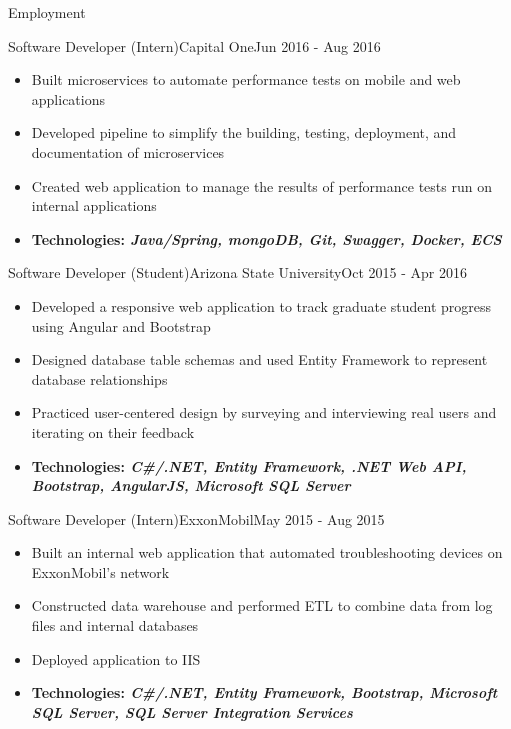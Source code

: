\documentclass[]{mcdowellcv}
\begin{document}
\begin{cvsection}{Employment}
		\begin{cvsubsection}{Software Developer (Intern)}{Capital One}{Jun 2016 - Aug 2016}
			\begin{itemize}
				\item Built microservices to automate performance tests on mobile and web applications
				\item Developed pipeline to simplify the building, testing, deployment, and documentation of microservices
				\item Created web application to manage the results of performance tests run on internal applications
				\item \textbf{Technologies: \emph{Java/Spring, mongoDB, Git, Swagger, Docker, ECS}}
			\end{itemize}
		\end{cvsubsection}

		\begin{cvsubsection}{Software Developer (Student)}{Arizona State University}{Oct 2015 - Apr 2016}
			\begin{itemize}
				\item Developed a responsive web application to track graduate student progress using Angular and Bootstrap
				\item Designed database table schemas and used Entity Framework to represent database relationships
				\item Practiced user-centered design by surveying and interviewing real users and iterating on their feedback
				\item \textbf{Technologies: \emph{C\#/.NET, Entity Framework, .NET Web API, Bootstrap, AngularJS, Microsoft SQL Server}}
			\end{itemize}
		\end{cvsubsection}

		\begin{cvsubsection}{Software Developer (Intern)}{ExxonMobil}{May 2015 - Aug 2015}
			\begin{itemize}
				\item Built an internal web application that automated troubleshooting devices on ExxonMobil’s network
				\item Constructed data warehouse and performed ETL to combine data from log files and internal databases
				\item Deployed application to IIS
				\item \textbf{Technologies: \emph{C\#/.NET, Entity Framework, Bootstrap, Microsoft SQL Server, SQL Server Integration Services}}
			\end{itemize}
		\end{cvsubsection}
	\end{cvsection}
\end{document}
